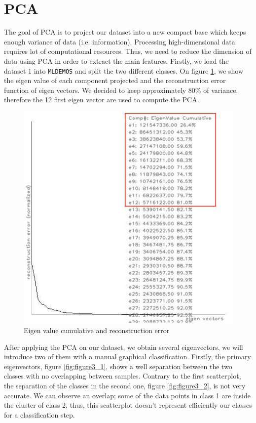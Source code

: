 \section{PCA}

	The goal of PCA is to project our dataset into a new compact base which keeps enough variance of data (i.e. information). Processing high-dimensional data requires lot of computational resources. Thus, we need to reduce the dimension of data using PCA in order to extract the main features. Firstly, we load the dataset 1 into \texttt{MLDEMOS} and split the two different classes. On figure \ref{fig:figure2}, we show the eigen value of each component projected and the reconstruction error function of eigen vectors. We decided to keep approximately 80\% of variance, therefore the 12 first eigen vector are used to compute the PCA.  \\
\begin{figure}[ht]
\centering
    \centering
	\includegraphics[height=0.1\textheight]{pca/Eigenvalue.jpeg}
	\caption{Eigen value cumulative and reconstruction error}
	\label{fig:figure2}
\end{figure}
	After applying the PCA on our dataset, we obtain several eigenvectors, we will introduce two of them with a manual graphical classification. Firstly, the primary eigenvectors, figure \ref{fig:figure3_1}, shows a well separation between the two classes with no overlapping between samples. Contrary to the first scatterplot, the separation of the classes in the second one, figure \ref{fig:figure3_2}, is not very accurate. We can observe an overlap; some of the data points in class 1 are inside the cluster of class 2, thus, this scatterplot doesn't represent efficiently our classes for a classification step.  
